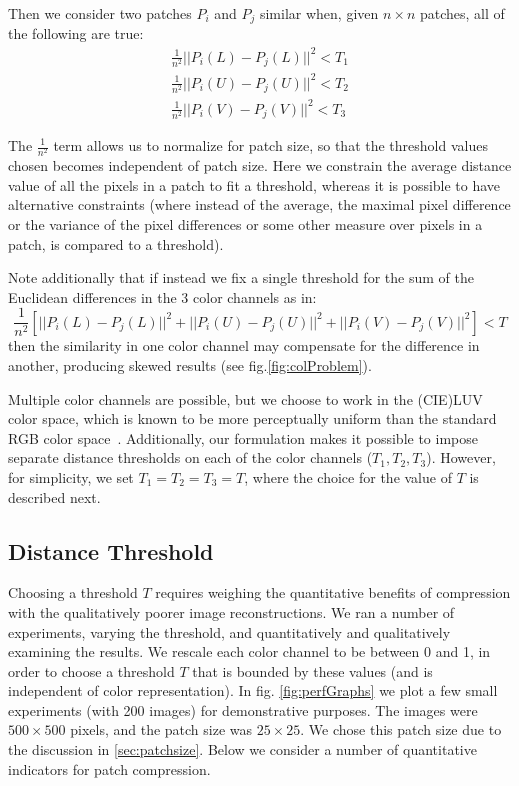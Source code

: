 Then we consider two patches $P_i$ and $P_j$ similar when, given $n\times n$ patches, all of the following are true:
\begin{align*}
\frac{1}{n^2}||P_i(L) - P_j(L)||^2 < T_1 \\
\frac{1}{n^2}||P_i(U) - P_j(U)||^2 < T_2 \\
\frac{1}{n^2}||P_i(V) - P_j(V)||^2 < T_3
\end{align*}

The $\frac{1}{n^2}$ term allows us to normalize for patch size, so that the threshold values chosen becomes independent of patch size. Here we constrain the average distance value of all the pixels in a patch to fit a threshold, whereas it is possible to have alternative constraints (where instead of the average, the maximal pixel difference or the variance of the pixel differences or some other measure over pixels in a patch, is compared to a threshold).

Note additionally that if instead we fix a single threshold for the sum of the Euclidean differences in the 3 color channels as in:
\begin{displaymath}
\frac{1}{n^2}[||P_i(L) - P_j(L)||^2 + ||P_i(U) - P_j(U)||^2 + ||P_i(V) - P_j(V)||^2] < T
\end{displaymath}
then the similarity in one color channel may compensate for the difference in another, producing skewed results (see fig.\ref{fig:colProblem}).

Multiple color channels are possible, but we choose to work in the (CIE)LUV color space, which is known to be more perceptually uniform than the standard RGB color space~\cite{kekre2012performance}. Additionally, our formulation makes it possible to impose separate distance thresholds on each of the color channels ($T_1,T_2,T_3$). However, for simplicity, we set $T_1=T_2=T_3=T$, where the choice for the value of $T$ is described next.

\subsection{Distance Threshold}

Choosing a threshold $T$ requires weighing the quantitative benefits of compression with the qualitatively poorer image reconstructions. We ran a number of experiments, varying the threshold, and quantitatively and qualitatively examining the results. We rescale each color channel to be between 0 and 1, in order to choose a threshold $T$ that is bounded by these values (and is independent of color representation). In fig. \ref{fig:perfGraphs} we plot a few small experiments (with 200 images) for demonstrative purposes. The images were $500\times 500$ pixels, and the patch size was $25\times 25$. We chose this patch size due to the discussion in \ref{sec:patchsize}. Below we consider a number of quantitative indicators for patch compression.

